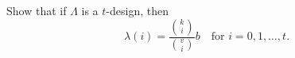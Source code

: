 Show that if $\Lambda$ is a $t$-design, then
$$\lambda(i) = \frac{\binom{k}{i}}{\binom{v}{i}} b \quad \text{for } i = 0, 1, \ldots, t.$$
